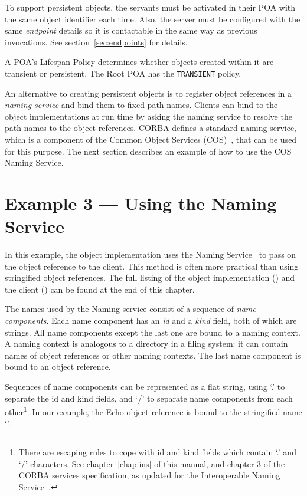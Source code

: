 \documentclass[11pt,oneside,a4paper]{book}
\newcommand{\code}[1]{\texttt{#1}}
\newcommand{\term}[1]{\textit{#1}}
\begin{document}
To support persistent objects, the servants must be activated in their
POA with the same object identifier each time. Also, the server must
be configured with the same \term{endpoint} details so it is
contactable in the same way as previous invocations. See
section~\ref{sec:endpoints} for details.

A POA's Lifespan Policy determines whether objects created within it
are transient or persistent. The Root POA has the \code{TRANSIENT}
policy.

An alternative to creating persistent objects is to register object
references in a \term{naming service} and bind them to fixed path
names. Clients can bind to the object implementations at run time by
asking the naming service to resolve the path names to the object
references. CORBA defines a standard naming service, which is a
component of the Common Object Services (COS)~\cite{corbaservices},
that can be used for this purpose. The next section describes an
example of how to use the COS Naming Service.


\section{Example 3 --- Using the Naming Service}

In this example, the object implementation uses the Naming
Service~\cite{corbaservices} to pass on the object reference to the
client.  This method is often more practical than using stringified
object references. The full listing of the object implementation
() and the client () can be found
at the end of this chapter.

The names used by the Naming service consist of a sequence of
\term{name components}. Each name component has an \term{id} and a
\term{kind} field, both of which are strings. All name components
except the last one are bound to a naming context. A naming context is
analogous to a directory in a filing system: it can contain names of
object references or other naming contexts. The last name component is
bound to an object reference.

Sequences of name components can be represented as a flat string,
using `.' to separate the id and kind fields, and `/' to separate name
components from each other\footnote{There are escaping rules to cope
with id and kind fields which contain `.' and `/' characters. See
chapter~\ref{chap:ins} of this manual, and chapter 3 of the CORBA
services specification, as updated for the Interoperable Naming
Service~\cite{inschapters}.}. In our example, the Echo object
reference is bound to the stringified name
`'.
\end{document}
